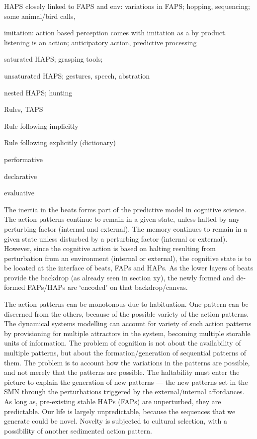 HAPS closely linked to FAPS and env: variations in FAPS; hopping, sequencing; some animal/bird calls, 

imitation: action based perception comes with imitation as a by product. listening is an action; anticipatory action, predictive processing 

saturated HAPS; grasping tools; 

unsaturated HAPS; gestures, speech, abstration  

nested HAPS; hunting 

Rules, TAPS

Rule following implicitly 

Rule following explicitly (dictionary)

performative 

declarative 

evaluative 




The inertia in the beats forms part of the predictive model in cognitive science. The action patterns continue to remain in a given state, unless halted by any perturbing factor (internal and external). The memory continues to remain in a given state unless disturbed by a perturbing factor (internal or external). However, since the cognitive action is based on halting resulting from perturbation from an environment (internal or external), the cognitive state is to be located at the interface of beats, FAPs and HAPs. As the lower layers of beats provide the backdrop (as already seen in section xy), the newly formed and de-formed FAPs/HAPs are `encoded' on that backdrop/canvas.

The action patterns can be monotonous due to habituation. One pattern can be discerned from the others, because of the possible variety of the action patterns. The dynamical systems modelling can account for variety of such action patterns by provisioning for multiple attractors in the system, becoming multiple storable units of information. The problem of cognition is not about the availability of multiple patterns, but about the formation/generation of sequential patterns of them. The problem is to account how the variations in the patterns are possible, and not merely that the patterns are possible. The haltability must enter the picture to explain the generation of new patterns --- the new patterns set in the SMN through the perturbations triggered by the external/internal affordances. As long as, pre-existing stable HAPs (FAPs) are unperturbed, they are predictable. Our life is largely unpredictable, because the sequences that we generate could be novel. Novelty is subjected to cultural selection, with a possibility of another sedimented action pattern.

